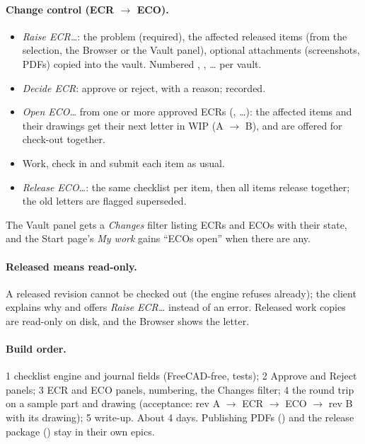 \paragraph{Change control (ECR $\rightarrow$ ECO).}
\begin{itemize}[nosep]
  \item \emph{Raise ECR\ldots}: the problem (required), the affected released items (from the selection, the Browser or
        the Vault panel), optional attachments (screenshots, PDFs) copied into the vault. Numbered
        , , \ldots{} per vault.
  \item \emph{Decide ECR}: approve or reject, with a reason; recorded.
  \item \emph{Open ECO\ldots} from one or more approved ECRs (, \ldots): the affected items and their
        drawings get their next letter in WIP (A $\rightarrow$ B), and are offered for check-out together.
  \item Work, check in and submit each item as usual.
  \item \emph{Release ECO\ldots}: the same checklist per item, then all items release together; the old letters are
        flagged superseded.
\end{itemize}
The Vault panel gets a \emph{Changes} filter listing ECRs and ECOs with their state, and the Start page's \emph{My work}
gains ``ECOs open'' when there are any.

\paragraph{Released means read-only.} A released revision cannot be checked out (the engine refuses already); the client
explains why and offers \emph{Raise ECR\ldots} instead of an error. Released work copies are read-only on disk, and the
Browser shows the letter.

\paragraph{Build order.} 1 checklist engine and journal fields (FreeCAD-free, tests); 2 Approve and Reject panels;
3 ECR and ECO panels, numbering, the Changes filter; 4 the round trip on a sample part and drawing (acceptance:
rev A $\rightarrow$ ECR $\rightarrow$ ECO $\rightarrow$ rev B with its drawing); 5 write-up. About 4 days. Publishing PDFs
() and the release package () stay in their own epics.


